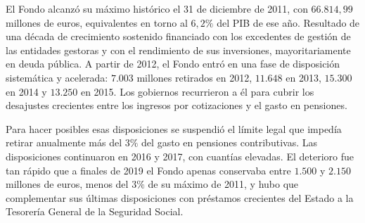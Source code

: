 \documentclass[10pt,a4paper]{article}
\begin{document}
El Fondo alcanzó su máximo histórico el 31 de diciembre de 2011, con $66.814,99$ millones de euros, equivalentes en torno al $6,2\%$ del PIB de ese año. Resultado de una década de crecimiento sostenido financiado con los excedentes de gestión de las entidades gestoras y con el rendimiento de sus inversiones, mayoritariamente en deuda pública. A partir de 2012, el Fondo entró en una fase de disposición sistemática y acelerada: $7.003$ millones retirados en 2012, $11.648$ en 2013, $15.300$ en 2014 y $13.250$ en 2015. Los gobiernos recurrieron a él para cubrir los desajustes crecientes entre los ingresos por cotizaciones y el gasto en pensiones.

Para hacer posibles esas disposiciones se suspendió el límite legal que impedía retirar anualmente más del $3\%$ del gasto en pensiones contributivas. Las disposiciones continuaron en 2016 y 2017, con cuantías elevadas. El deterioro fue tan rápido que a finales de 2019 el Fondo apenas conservaba entre $1.500$ y $2.150$ millones de euros, menos del $3\%$ de su máximo de 2011, y hubo que complementar sus últimas disposiciones con préstamos crecientes del Estado a la Tesorería General de la Seguridad Social. 
\end{document}
